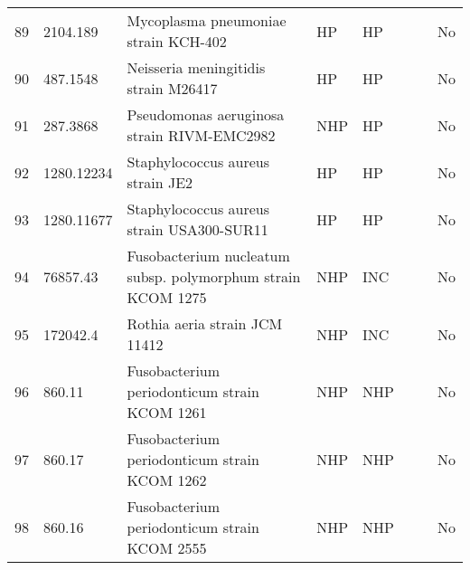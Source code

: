 \begin{tabular}{llllllll}
89  &    2104.189 &                              Mycoplasma pneumoniae strain KCH-402 &            HP &              HP &                                      \cite{kenri2017complete} &                                  &            No \\
90  &    487.1548 &                              Neisseria meningitidis strain M26417 &            HP &              HP &                                 \cite{folaranmi2017increased} &    \cite{bernardini2004proteome} &            No \\
91  &    287.3868 &                        Pseudomonas aeruginosa strain RIVM-EMC2982 &           NHP &              HP &                                         \cite{botelho2018two} &         \cite{diggle2020microbe} &            No \\
92  &  1280.12234 &                                  Staphylococcus aureus strain JE2 &            HP &              HP &                                             \cite{1280.12234} &                 \cite{o2017into} &            No \\
93  &  1280.11677 &                         Staphylococcus aureus strain USA300-SUR11 &            HP &              HP &                                             \cite{1280.11677} &                 \cite{o2017into} &            No \\
94  &    76857.43 &       Fusobacterium nucleatum subsp. polymorphum strain KCOM 1275 &           NHP &             INC &                                   \cite{han2015fusobacterium} &                                  &            No \\
95  &    172042.4 &                                     Rothia aeria strain JCM 11412 &           NHP &             INC &                                                               &         \cite{nambu2016complete} &            No \\
96  &      860.11 &                      Fusobacterium periodonticum strain KCOM 1261 &           NHP &             NHP &                                 \cite{sphaerophorus2006genus} &                                  &            No \\
97  &      860.17 &                      Fusobacterium periodonticum strain KCOM 1262 &           NHP &             NHP &                                 \cite{sphaerophorus2006genus} &                                  &            No \\
98  &      860.16 &                      Fusobacterium periodonticum strain KCOM 2555 &           NHP &             NHP &                                 \cite{sphaerophorus2006genus} &                                  &            No \\

\end{tabular}
